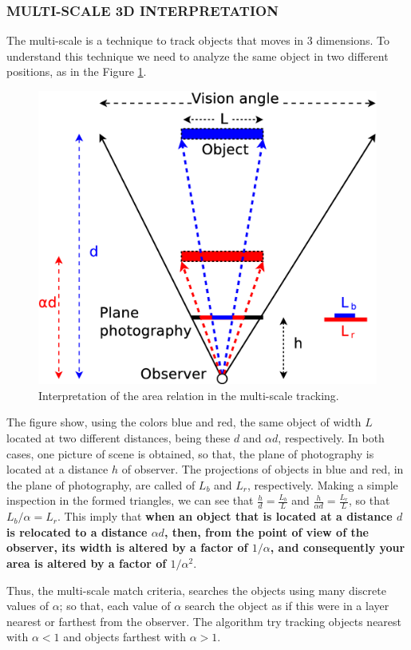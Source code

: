 \subsubsection{MULTI-SCALE 3D INTERPRETATION}
The multi-scale is a technique to track objects that moves in 3 dimensions. 
To understand this technique we need to analyze the same object in 
two different positions, as in the Figure \ref{fig:multiscale3d}.

\begin{figure}[H]
\centering
  \includegraphics[width=.7\columnwidth]{images/Diagrama3.eps}
  \caption{Interpretation of the area relation in the multi-scale tracking.}
  \label{fig:multiscale3d}
\end{figure}
The figure show, using the colors blue and red, the same object of width $L$ located at two 
different distances, being these $d$ and $\alpha d$, respectively. 
In both cases, one picture of scene is obtained,
so that, the plane of photography is located at a distance $h$ of observer.
The projections of objects in blue and red, in the plane of photography, are
called of $L_b$ and $L_r$, respectively. Making a simple inspection in the
formed triangles, we can see that $\frac{h}{d}=\frac{L_b}{L}$ and 
$\frac{h}{\alpha d}=\frac{L_r}{L}$, so that $L_b/\alpha= L_r$. 
This imply that \textbf{when an object that is located
at a distance $d$ is relocated to a distance  $\alpha d$, then,
from the point of view of the observer, its width is altered by a factor of $1/\alpha$,
and consequently your area is altered by a factor of $1/\alpha^2$}.

Thus, the multi-scale match criteria, searches the objects
using many discrete values of $\alpha$; so that, each value of $\alpha$
search the object as if this were in a layer nearest or farthest from the observer.
The algorithm try tracking objects nearest with $\alpha<1$ and objects farthest with $\alpha>1$.

